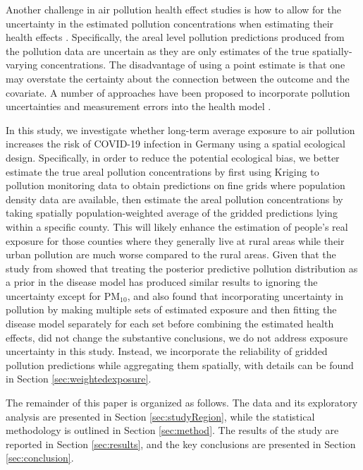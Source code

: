 \documentclass[12,]{article}
\begin{document}
Another challenge in air pollution health effect studies is how to allow
for the uncertainty in the estimated pollution concentrations when
estimating their health effects \autocites{Huang2018}{Blair2007}.
Specifically, the areal level pollution predictions produced from the
pollution data are uncertain as they are only estimates of the true
spatially-varying concentrations. The disadvantage of using a point
estimate is that one may overstate the certainty about the connection
between the outcome and the covariate. A number of approaches have been
proposed to incorporate pollution uncertainties and measurement errors
into the health model
\autocites[e.g.,][]{Huang2018}{Lee2017}{Blangiardo2016}{Gryparis2009}.

In this study, we investigate whether long-term average exposure to air
pollution increases the risk of COVID-19 infection in Germany using a
spatial ecological design. Specifically, in order to reduce the
potential ecological bias, we better estimate the true areal pollution
concentrations by first using Kriging to pollution monitoring data to
obtain predictions on fine grids where population density data are
available, then estimate the areal pollution concentrations by taking
spatially population-weighted average of the gridded predictions lying
within a specific county. This will likely enhance the estimation of
people's real exposure for those counties where they generally live at
rural areas while their urban pollution are much worse compared to the
rural areas. Given that the study from \textcite{Lee2017} showed that
treating the posterior predictive pollution distribution as a prior in
the disease model has produced similar results to ignoring the
uncertainty except for PM\(_{10}\), and \textcite{Blangiardo2016} also
found that incorporating uncertainty in pollution by making multiple
sets of estimated exposure and then fitting the disease model separately
for each set before combining the estimated health effects, did not
change the substantive conclusions, we do not address exposure
uncertainty in this study. Instead, we incorporate the reliability of
gridded pollution predictions while aggregating them spatially, with
details can be found in Section \ref{sec:weightedexposure}.

The remainder of this paper is organized as follows. The data and its
exploratory analysis are presented in Section \ref{sec:studyRegion},
while the statistical methodology is outlined in Section
\ref{sec:method}. The results of the study are reported in Section
\ref{sec:results}, and the key conclusions are presented in Section
\ref{sec:conclusion}.
\end{document}
